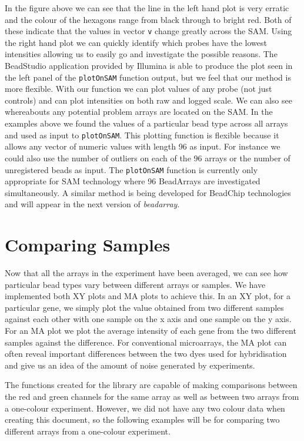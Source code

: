 \documentclass[a4paper]{article}
\newcommand{\Robject}[1]{{\texttt{#1}}}
\newcommand{\Rfunction}[1]{{\texttt{#1}}}
\newcommand{\Rpackage}[1]{{\textit{#1}}}
\begin{document}
In the figure above we can see that the line in the left hand plot is very erratic and the colour of the hexagons range from black through to bright red.  Both of these indicate that the values in vector \Robject{v} change greatly across the SAM.  Using the right hand plot we can quickly identify which probes have the lowest intensities allowing us to easily go and investigate the possible reasons. The BeadStudio application provided by Illumina is able to produce the plot seen in the left panel of the \Rfunction{plotOnSAM} function output, but we feel that our method is more flexible. With our function we can plot values of any 
probe (not just controls) and can plot intensities on both raw and logged scale. We can also see whereabouts any potential problem arrays are located on the SAM. In the examples above we found the values of a particular bead type across all arrays and used as input to \Rfunction{plotOnSAM}. This plotting function is flexible because it allows any vector of numeric values with length 96 as input. For instance we could also use the number of outliers on each of the 96 arrays or the number of unregistered beads as input. 
The \Rfunction{plotOnSAM} function is currently only appropriate for SAM technology where 96 BeadArrays are investigated simultaneously. A similar method is being developed for BeadChip technologies and will appear in the next version of \Rpackage{beadarray}.

\section{Comparing Samples}
\label{comparing_samples}

Now that all the arrays in the experiment have been averaged, we can see how particular bead types vary between different arrays or samples. We have implemented both XY plots and MA plots to achieve this.
In an XY plot, for a particular gene, we simply plot the value obtained from two different samples against each other with one sample on the x axis and one sample on the y axis. For an MA plot we plot the average intensity 
of each gene from the two different samples against the difference. For conventional microarrays, the MA plot can often reveal important differences between the two dyes used for hybridisation and give us an idea of the 
amount of noise generated by experiments. 

The functions created for the library are capable of making comparisons between the red and green channels for the same array as well as between two arrays from a one-colour experiment. However, we did not have any two 
colour data when creating this document, so the following examples will be for comparing two different arrays from a one-colour experiment.
\end{document}
